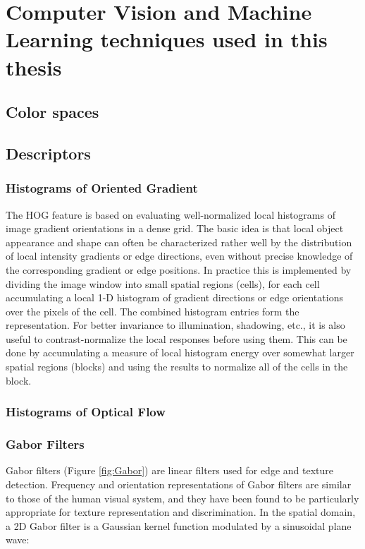 
\chapter{Computer Vision and Machine Learning techniques used in this thesis}
\label{chpt2}

\section{Color spaces}
\section{Descriptors}
\subsection{Histograms of Oriented Gradient}
The HOG feature \cite{dalal2005histograms} is based on evaluating well-normalized local histograms of image gradient orientations
in a dense grid. The basic idea is that local object appearance and shape can often be characterized rather well by the distribution of local intensity gradients or edge directions, even without precise knowledge of the corresponding gradient or edge positions. In practice this is implemented by dividing the image window into small spatial regions (cells), for each cell accumulating a local 1-D histogram of gradient directions or edge orientations over the pixels of the cell. The combined histogram entries form the representation. For better invariance to illumination, shadowing, etc., it is also useful to contrast-normalize the local 
responses before using them. This can be done by accumulating a measure of local histogram energy over somewhat
larger spatial regions (blocks) and using the results to normalize all of the cells in the block. 

\subsection{Histograms of Optical Flow}
\subsection{Gabor Filters}
\label{Gabor}
Gabor filters (Figure \ref{fig:Gabor}) are linear filters used for edge and texture detection. Frequency and orientation representations of Gabor filters are similar to those of the human visual system, and they have been found to be particularly appropriate for texture representation and discrimination. In the spatial domain, a 2D Gabor filter is a Gaussian kernel function modulated by a sinusoidal plane wave:

